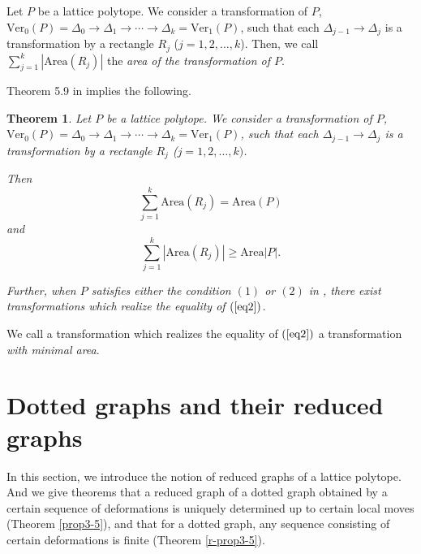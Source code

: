 \documentclass[a4paper,11pt]{amsart}
\numberwithin{equation}{section}
\newtheorem{theorem}{Theorem}[section]
\begin{document}
 
\begin{definition}
 

Let $P$ be a lattice polytope. We consider a transformation of $P$,  
$\mathrm{Ver}_0(P)=\Delta_0 \to \Delta_1\to \cdots \to \Delta_k=\mathrm{Ver}_1(P)$, such that each $\Delta_{j-1} \to \Delta_j$ is a transformation by a rectangle $R_j$ 
($j=1,2,\ldots,k$). 
Then, we call $\sum_{j=1}^k |\mathrm{Area}(R_j)|$ the {\it area of the transformation of $P$}.

\end{definition} 
 

Theorem 5.9 in \cite{N} implies the following. 

\begin{theorem}\label{thm3-10}
Let $P$ be a lattice polytope. We consider a transformation of $P$,  
$\mathrm{Ver}_0(P)=\Delta_0 \to \Delta_1\to \cdots \to \Delta_k=\mathrm{Ver}_1(P)$, such that each $\Delta_{j-1} \to \Delta_j$ is a transformation by a rectangle $R_j$ 
($j=1,2,\ldots, k)$. 

Then
\begin{equation}\label{eq0}
\sum _{j=1}^k \mathrm{Area}(R_j) =\mathrm{Area}(P) 
\end{equation}
and 
\begin{equation}\label{eq2}
\sum_{j=1}^k |\mathrm{Area}(R_j)|\geq \mathrm{Area}|P|. 
\end{equation}

Further, when $P$ satisfies either the condition $(1)$ or $(2)$ in \cite[Theorem 5.9]{N}, there exist transformations which realize the equality of $(\ref{eq2})$.  

 \end{theorem}

We call a transformation which realizes the equality of $(\ref{eq2})$ a transformation {\it with minimal area}.  

\section{Dotted graphs and their reduced graphs}\label{sec2}
In this section, we introduce the notion of reduced graphs of a lattice polytope. And we give theorems that a reduced graph of a dotted graph obtained by a certain sequence of deformations is uniquely determined up to certain local moves (Theorem \ref{prop3-5}), and that for a dotted graph, any sequence consisting of certain deformations is finite (Theorem \ref{r-prop3-5}). 
\end{document}
